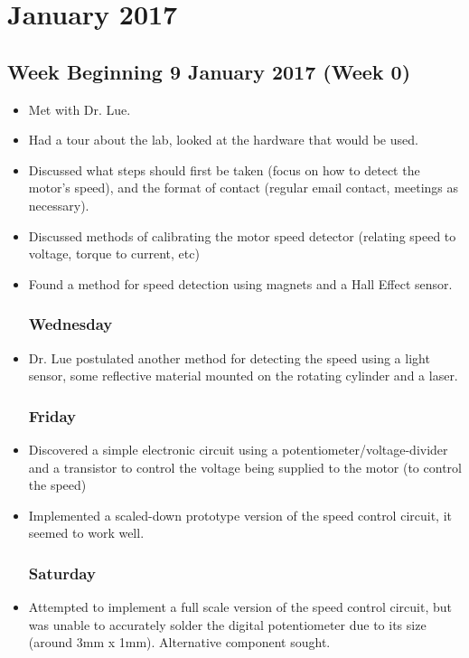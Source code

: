 \documentclass[a4]{report}
\begin{document}
	\chapter{January 2017}
	\section{Week Beginning 9 January 2017 (Week 0)}
	\begin{itemize}
		\subsection*{Monday}
		\item Met with Dr. Lue.
		\item Had a tour about the lab, looked at the hardware that would be used.
		\item Discussed what steps should first be taken (focus on how to detect the motor's speed), and the format of contact (regular email contact, meetings as necessary).
		\item Discussed methods of calibrating the motor speed detector (relating speed to voltage, torque to current, etc)
		\item Found a method for speed detection using magnets and a Hall Effect sensor.
		\subsection*{Wednesday}
		\item Dr. Lue postulated another method for detecting the speed using a light sensor, some reflective material mounted on the rotating cylinder and a laser.
		\subsection*{Friday}
		\item Discovered a simple electronic circuit using a potentiometer/voltage-divider and a transistor to control the voltage being supplied to the motor (to control the speed)
		\item Implemented a scaled-down prototype version of the speed control circuit, it seemed to work well.
		\subsection*{Saturday}
		\item Attempted to implement a full scale version of the speed control circuit, but was unable to accurately solder the digital potentiometer due to its size (around 3mm x 1mm). Alternative component sought.
	\end{itemize}
	\newpage
\end{document}
